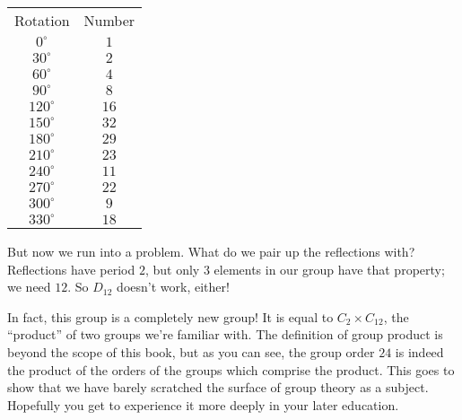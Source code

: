 \documentclass[../gatm.tex]{subfiles}
\begin{document}
\begin{center}
\begin{tabular}{|c|c|}
Rotation & Number \\
$0^\circ$ & $1$ \\
$30^\circ$ & $2$ \\
$60^\circ$ & $4$ \\
$90^\circ$ & $8$ \\
$120^\circ$ & $16$ \\
$150^\circ$ & $32$ \\
$180^\circ$ & $29$ \\
$210^\circ$ & $23$ \\
$240^\circ$ & $11$ \\
$270^\circ$ & $22$ \\
$300^\circ$ & $9$ \\
$330^\circ$ & $18$ \\
\end{tabular}
\end{center}

But now we run into a problem. What do we pair up the reflections with? Reflections have period $2$, but only $3$ elements in our group have that property; we need $12$. So $D_{12}$ doesn't work, either!

In fact, this group is a completely new group! It is equal to $C_2\times C_12$, the ``product'' of two groups we're familiar with. The definition of group product is beyond the scope of this book, but as you can see, the group order $24$ is indeed the product of the orders of the groups which comprise the product. This goes to show that we have barely scratched the surface of group theory as a subject. Hopefully you get to experience it more deeply in your later education.
\end{document}
